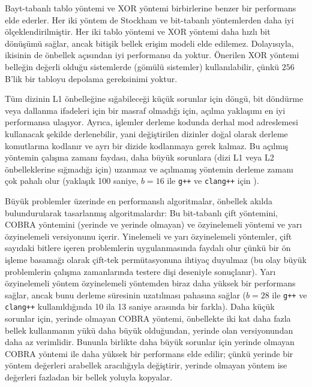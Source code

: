 \documentclass[10pt]{article}
\begin{document}
Bayt-tabanl{\i} tablo y\"{o}ntemi ve XOR y\"{o}ntemi birbirlerine benzer bir 
performans elde ederler. Her iki y\"{o}ntem de Stockham ve bit-tabanl{\i} 
y\"{o}ntemlerden daha iyi \"{o}l\c{c}eklendirilmi\c{s}tir. Her iki tablo y\"{o}ntemi 
ve XOR y\"{o}ntemi daha h{\i}zl{\i} bit d\"{o}n\"{u}\c{s}\"{u}m\"{u} sa\u{g}lar, ancak biti\c{s}ik bellek 
eri\c{s}im modeli elde edilemez. Dolay{\i}s{\i}yla, ikisinin de \"{o}nbellek 
a\c{c}{\i}s{\i}ndan iyi performans{\i} da yoktur. \"{O}nerilen XOR y\"{o}ntemi  
belle\u{g}in de\u{g}erli oldu\u{g}u sistemlerde (g\"{o}m\"{u}l\"{u} sistemler) 
kullan{\i}labilir, \c{c}\"{u}nk\"{u} $256$B'lik bir tabloyu depolama 
gereksinimi yoktur.

T\"{u}m dizinin L1 \"{o}nbelle\u{g}ine s{\i}\u{g}abilece\u{g}i k\"{u}\c{c}\"{u}k sorunlar i\c{c}in 
d\"{o}ng\"{u}, bit d\"{o}nd\"{u}rme veya dallanma ifadeleri i\c{c}in bir masraf 
olmad{\i}\u{g}{\i} i\c{c}in, a\c{c}{\i}lma yakla\c{s}{\i}m{\i} en iyi performansa ula\c{s}{\i}yor. 
Ayr{\i}ca, i\c{s}lemler derleme kodunda derhal mod adreslemesi 
kullanacak \c{s}ekilde derlenebilir, yani de\u{g}i\c{s}tirilen dizinler 
do\u{g}al olarak derleme komutlar{\i}na kodlan{\i}r ve ayr{\i} bir dizide 
kodlanmaya gerek kalmaz. Bu a\c{c}{\i}lm{\i}\c{s} y\"{o}ntemin \c{c}al{\i}\c{s}ma zaman{\i} 
faydas{\i}, daha b\"{u}y\"{u}k sorunlara (dizi L1 veya L2 \"{o}nbelleklerine 
s{\i}\u{g}mad{\i}\u{g}{\i} i\c{c}in) uzanmaz ve a\c{c}{\i}lmam{\i}\c{s} y\"{o}ntemin derleme 
zaman{\i} \c{c}ok pahal{\i} olur (yakla\c{s}{\i}k 100 saniye, $b=16$ ile 
{\tt g++} ve {\tt clang++} i\c{c}in ).

B\"{u}y\"{u}k problemler \"{u}zerinde en performansl{\i} algoritmalar, 
\"{o}nbellek ak{\i}lda bulundurularak tasarlanm{\i}\c{s} algoritmalard{\i}r: 
Bu bit-tabanl{\i} \c{c}ift y\"{o}ntemini, COBRA y\"{o}ntemini 
(yerinde ve yerinde olmayan) ve \"{o}zyinelemeli y\"{o}ntemi ve 
yar{\i} \"{o}zyinelemeli versiyonunu i\c{c}erir. Yinelemeli ve yar{\i} 
\"{o}zyinelemeli y\"{o}ntemler, \c{c}ift say{\i}daki bitlere i\c{c}eren 
problemlerin uygulanmas{\i}nda faydal{\i} olur \c{c}\"{u}nk\"{u} bir 
\"{o}n i\c{s}leme basama\u{g}{\i} olarak \c{c}ift-tek perm\"{u}tasyonuna ihtiya\c{c} 
duyulmaz (bu olay b\"{u}y\"{u}k problemlerin \c{c}al{\i}\c{s}ma zamanlar{\i}nda 
testere di\c{s}i deseniyle sonu\c{c}lan{\i}r). Yar{\i} \"{o}zyinelemeli 
y\"{o}ntem \"{o}zyinelemeli y\"{o}ntemden biraz daha y\"{u}ksek bir 
performans sa\u{g}lar, ancak bunu derleme s\"{u}resinin uzat{\i}lmas{\i} pahas{\i}na sa\u{g}lar
($b=28$ ile {\tt g++} ve {\tt clang++} kullan{\i}ld{\i}\u{g}{\i}nda 
10 ila 13 saniye aras{\i}nda bir farkla). Daha k\"{u}\c{c}\"{u}k sorunlar 
i\c{c}in, yerinde olmayan COBRA y\"{o}ntemi, \"{o}nbellekte iki kat 
daha fazla bellek kullanman{\i}n y\"{u}k\"{u} daha b\"{u}y\"{u}k oldu\u{g}undan, 
yerinde olan versiyonundan daha az verimlidir. Bununla 
birlikte daha b\"{u}y\"{u}k sorunlar i\c{c}in yerinde olmayan COBRA 
y\"{o}ntemi ile daha y\"{u}ksek bir performans elde edilir; 
\c{c}\"{u}nk\"{u} yerinde bir y\"{o}ntem de\u{g}erleri arabellek arac{\i}l{\i}\u{g}{\i}yla de\u{g}i\c{s}tirir,
yerinde olmayan y\"{o}ntem ise de\u{g}erleri fazladan bir bellek 
yoluyla kopyalar.
\end{document}
